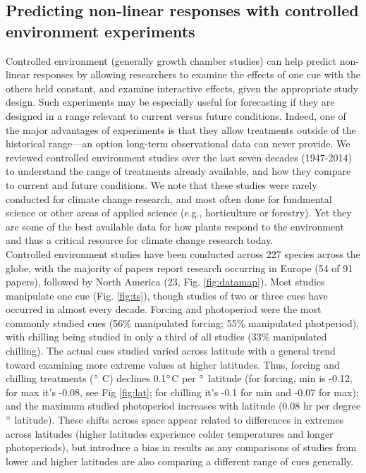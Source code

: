 \documentclass[11pt,letter]{article}
\begin{document}
\subsection{Predicting non-linear responses with controlled environment experiments} %

Controlled environment (generally growth chamber studies) can help predict non-linear responses by allowing researchers to examine the effects of one cue with the others held constant, and examine interactive effects, given the appropriate study design. Such experiments may be especially useful for forecasting if they are designed in a range relevant to current versus future conditions. Indeed, one of the major advantages of experiments is that they allow treatments outside of the historical range---an option long-term observational data can never provide. We reviewed controlled environment studies over the last seven decades (1947-2014) to understand the range of treatments already available, and how they compare to current and future conditions. We note that these studies were rarely conducted for climate change research, and most often done for fundmental science or other areas of applied science (e.g., horticulture or forestry). Yet they are some of the best available data for how plants respond to the environment and thus a critical resource for climate change research today.\\

Controlled environment studies have been conducted across 227 species across the globe, with the majority of papers report research occurring in Europe (54 of 91 papers), followed by North America (23, Fig. \ref{fig:datamap}). Most studies manipulate one cue (Fig. \ref{fig:ts}), though studies of two or three cues have occurred in almost every decade. Forcing and photoperiod were the most commonly studied cues (56\% manipulated forcing; 55\% manipulated photperiod), with chilling being studied in only a third of all studies (33\% manipulated chilling). The actual cues studied varied across latitude with a general trend toward examining more extreme values at higher latitudes. Thus, forcing and chilling treatments ($\degree$ C) declines 0.1$\degree$C per $\degree$ latitude (for forcing, min is -0.12, for max it's -0.08, see Fig \ref{fig:lat}; for chilling it's -0.1 for min and -0.07 for max); and the maximum studied photoperiod increases with latitude (0.08 hr per degree $\degree$ latitude). These shifts across space appear related to differences in extremes across latitudes (higher latitudes experience colder temperatures and longer photoperiods), but introduce a bias in results as any comparisons of studies from lower and higher latitudes are also comparing a different range of cues generally. \\
\end{document}

